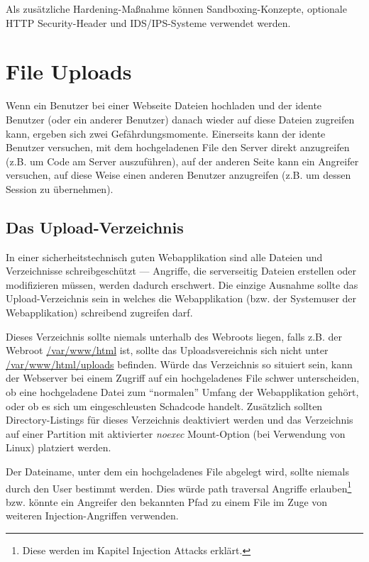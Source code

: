 Als zusätzliche Hardening-Maßnahme können Sandboxing-Konzepte, optionale HTTP Security-Header und IDS/IPS-Systeme verwendet werden.

\section{File Uploads}

Wenn ein Benutzer bei einer Webseite Dateien hochladen und der idente Benutzer (oder ein anderer Benutzer) danach wieder auf diese Dateien zugreifen kann, ergeben sich zwei Gefährdungsmomente. Einerseits kann der idente Benutzer versuchen, mit dem hochgeladenen File den Server direkt anzugreifen (z.B. um Code am Server auszuführen), auf der anderen Seite kann ein Angreifer versuchen, auf diese Weise einen anderen Benutzer anzugreifen (z.B. um dessen Session zu übernehmen).

\subsection{Das Upload-Verzeichnis}

In einer sicherheitstechnisch guten Webapplikation sind alle Dateien und Verzeichnisse schreibgeschützt --- Angriffe, die serverseitig Dateien erstellen oder modifizieren müssen, werden dadurch erschwert. Die einzige Ausnahme sollte das Upload-Verzeichnis sein in welches die Webapplikation (bzw. der Systemuser der Webapplikation) schreibend zugreifen darf.

Dieses Verzeichnis sollte niemals unterhalb des Webroots liegen, falls z.B. der Webroot \url{/var/www/html} ist, sollte das Uploadsvereichnis sich nicht unter \url{/var/www/html/uploads} befinden. Würde das Verzeichnis so situiert sein, kann der Webserver bei einem Zugriff auf ein hochgeladenes File schwer unterscheiden, ob eine hochgeladene Datei zum ``normalen'' Umfang der Webapplikation gehört, oder ob es sich um eingeschleusten Schadcode handelt. Zusätzlich sollten Directory-Listings für dieses Verzeichnis deaktiviert werden und das Verzeichnis auf einer Partition mit aktivierter \textit{noexec} Mount-Option (bei Verwendung von Linux) platziert werden.

Der Dateiname, unter dem ein hochgeladenes File abgelegt wird, sollte niemals durch den User bestimmt werden. Dies würde path traversal Angriffe erlauben\footnote{Diese werden im Kapitel Injection Attacks erklärt.} bzw. könnte ein Angreifer den bekannten Pfad zu einem File im Zuge von weiteren Injection-Angriffen verwenden.

